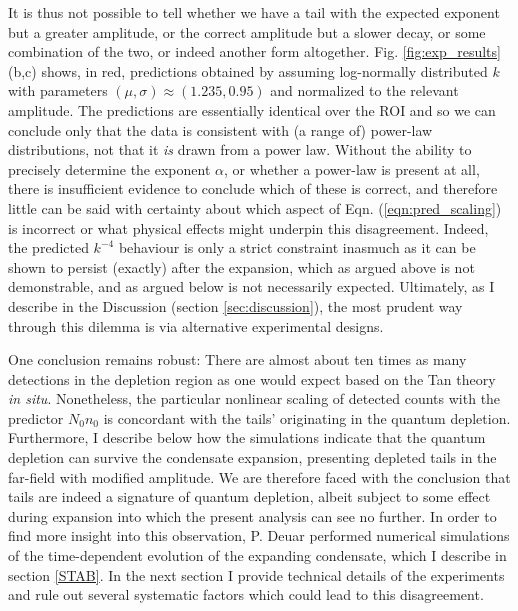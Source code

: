 	It is thus not possible to tell whether we have a tail with the expected exponent but a greater amplitude, or the correct amplitude but a slower decay, or some combination of the two, or indeed another form altogether.
	{Fig. \ref{fig:exp_results} (b,c) shows, in red, predictions obtained by assuming log-normally distributed $k$ with parameters $(\mu,\sigma) \approx (1.235,0.95)$ and normalized to the relevant amplitude.
	The predictions are essentially identical over the ROI and so we can conclude only that the data is consistent with (a range of) power-law distributions, not that it \emph{is} drawn from a power law.}
	Without the ability to precisely determine the exponent $\alpha$, or whether a power-law is present at all, there is insufficient evidence to conclude which of these is correct, and therefore little can be said with certainty about which aspect of Eqn. (\ref{eqn:pred_scaling}) is incorrect or what physical effects might underpin this disagreement.
	Indeed, the predicted $k^{-4}$ behaviour is only a strict constraint inasmuch as it can be shown to persist (exactly) after the expansion, which as argued above is not demonstrable, and as argued below is not necessarily expected.
	{Ultimately, as I describe in the Discussion (section \ref {sec:discussion}), the most prudent way through this dilemma is via alternative experimental designs.}
	
	One conclusion remains robust: There are {almost} about ten times as many detections in the depletion region as one would expect based on the Tan theory {\emph{in situ}}. 
	Nonetheless, the particular nonlinear scaling of detected counts with the predictor $N_0n_0$ is concordant with the tails' originating in the quantum depletion.
	Furthermore, I describe below how the simulations indicate that the quantum depletion can survive the condensate expansion, presenting depleted tails in the far-field with modified amplitude. 
	We are therefore faced with the conclusion that tails are indeed a signature of quantum depletion, albeit subject to some effect during expansion into which the present analysis can see no further. 
	In order to find more insight into this observation, P. Deuar performed numerical simulations of the time-dependent evolution of the expanding condensate, which I describe in section \ref{STAB}.
	In the next section I provide technical details of the experiments and rule out several systematic factors which could lead to this disagreement.
 	
